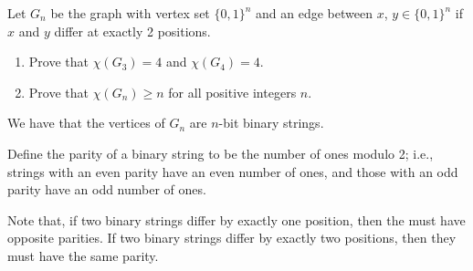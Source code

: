\documentclass[../hw7]{subfiles}
\begin{document}
\begin{problem}
\item Let $G_n$ be the graph with vertex set $\{0,1\}^n$ and an edge between $x$, $y \in \{0,1\}^n$ if $x$ and $y$ differ at exactly 2 positions.
\begin{enumerate}
	\item Prove that $\chi(G_3) = 4$ and $\chi(G_4) = 4$.
	\item Prove that $\chi(G_n) \ge n$ for all positive integers $n$.
\end{enumerate}
\end{problem}
We have that the vertices of $G_n$ are $n$-bit binary strings.

Define the parity of a binary string to be the number of ones modulo 2;
i.e., strings with an even parity have an even number of ones,
and those with an odd parity have an odd number of ones.

Note that, if two binary strings differ by exactly one position, then the must have opposite parities.
If two binary strings differ by exactly two positions, then they must have the same parity.
\end{document}
